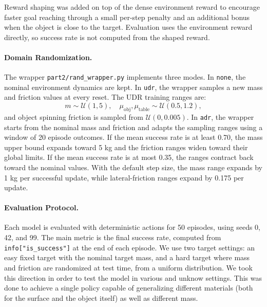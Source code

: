 Reward shaping was added on top of the dense environment reward to encourage faster goal reaching through a small per-step penalty and an additional bonus when the object is close to the target.
Evaluation uses the environment reward directly, so success rate is not computed from the shaped reward.

\paragraph{Domain Randomization.}
The wrapper \texttt{part2/rand\_wrapper.py} implements three modes. In \texttt{none}, the nominal environment dynamics are kept. In \texttt{udr}, the wrapper samples a new mass and friction values at every reset. The UDR training ranges are:
\begin{equation}
m \sim \mathcal{U}(1,5), \quad
\mu_{\mathrm{obj}},\mu_{\mathrm{table}} \sim \mathcal{U}(0.5,1.2),
\end{equation}
and object spinning friction is sampled from $\mathcal{U}(0,0.005)$.
In \texttt{adr}, the wrapper starts from the nominal mass and friction and adapts the sampling ranges using a window of 20 episode outcomes. If the mean success rate is at least 0.70, the mass upper bound expands toward 5 kg and the friction ranges widen toward their global limits. If the mean success rate is at most 0.35, the ranges contract back toward the nominal values. With the default step size, the mass range expands by 1 kg per successful update, while lateral-friction ranges expand by 0.175 per update.

\paragraph{Evaluation Protocol.}
Each model is evaluated with deterministic actions for 50 episodes, using seeds 0, 42, and 99. The main metric is the final success rate, computed from \texttt{info["is\_success"]} at the end of each episode. We use two target settings: an easy fixed target with the nominal target mass, and a hard target where mass and friction are randomized at test time,
from a uniform distribution. We took this direction in order to test the model in various and unknow settings. This was done to achieve a single policy capable of generalizing 
different materials (both for the surface and the object itself) as well as different mass.

\begin{table}[H]
\centering
\small
{}
\caption{Target-domain evaluation settings used for the final success-rate comparison.}
\label{tab:evaluation-settings}
\end{table}
